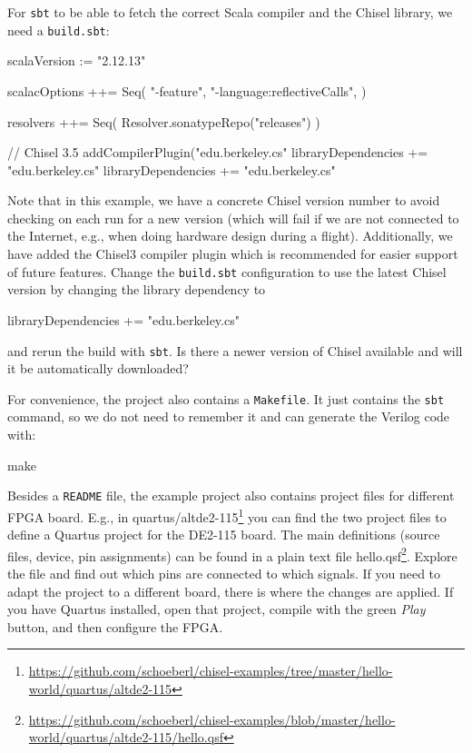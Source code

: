 \documentclass[%
    10pt,
    headinclude, footexclude,
    openright, %
    notitlepage,
    cleardoubleempty,
    headsepline,
    pointlessnumbers,
    bibtotoc, idxtotoc,
    ]{scrbook}
\newcommand{\code}[1]{{\small{\texttt{#1}}}}
\newcommand{\myref}[2]{\href{#1}{#2}}
\renewcommand{\myref}[2]{{#2}{\footnote{\url{#1}}}}
\begin{document}
For \code{sbt} to be able to fetch the correct Scala compiler and the Chisel library,
we need a \code{build.sbt}:

\begin{chisel}
scalaVersion := "2.12.13"

scalacOptions ++= Seq(
  "-feature",
  "-language:reflectiveCalls",
)

resolvers ++= Seq(
  Resolver.sonatypeRepo("releases")
)

// Chisel 3.5
addCompilerPlugin("edu.berkeley.cs" %
libraryDependencies += "edu.berkeley.cs" %
libraryDependencies += "edu.berkeley.cs" %
\end{chisel}

\noindent Note that in this example, we have a concrete Chisel version number to avoid checking on
each run for a new version (which will fail if we are not connected to the Internet,
e.g., when doing hardware design during a flight). Additionally, we have added the Chisel3 compiler
plugin which is recommended for easier support of future features.
Change the \code{build.sbt} configuration to use the latest Chisel version by changing the
library dependency to

\begin{chisel}
libraryDependencies += "edu.berkeley.cs" %
\end{chisel}

\noindent and rerun the build with \code{sbt}. Is there a newer version of Chisel
available and will it be automatically downloaded?

For convenience, the project also contains a \code{Makefile}.
It just contains the \code{sbt} command, so we do not need to remember it and
can generate the Verilog code with:

\begin{chisel}
make
\end{chisel}

Besides a \code{README} file, the example project also contains project
files for different FPGA board. E.g., in
\myref{https://github.com/schoeberl/chisel-examples/tree/master/hello-world/quartus/altde2-115}{quartus/altde2-115} 
you can find the two project files to define a Quartus project for the DE2-115 board.
The main definitions (source files, device, pin assignments) can be found in a plain text file
\myref{https://github.com/schoeberl/chisel-examples/blob/master/hello-world/quartus/altde2-115/hello.qsf}{hello.qsf}.
Explore the file and find out which pins are connected to which signals.
If you need to adapt the project to a different board, there is where the changes are applied.
If you have Quartus installed, open that project, compile with the green \emph{Play} button,
and then configure the FPGA.
\end{document}

